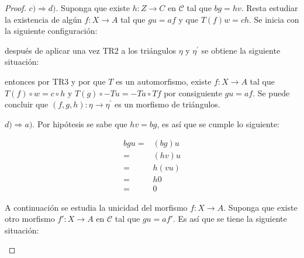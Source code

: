 \documentclass{article}
\newcommand{\cc}{\mathscr{C}}
\begin{document}
\begin{enumerate}
\begin{proof}
\bigskip

$c) \Rightarrow d)$. Suponga que existe $h:Z\to C$ en $\cc$ tal que $bg=hv$. Resta estudiar la existencia de alg\'un $f:X\to A$ tal que $gu=af$ y que $T(f)w=ch$. Se inicia con la siguiente configuración:

\begin{center}
\end{center}
después de aplicar una vez TR2 a los triángulos $\eta$ y $\eta^{'}$ se obtiene la siguiente situación:

\begin{center}
\end{center}
entonces por TR3 y por que $T$ es un automorfismo, existe $f:X\to A$ tal que $T(f)\circ w=c\circ h$ y $T(g)\circ -Tu=-Ta\circ Tf$ por consiguiente $gu=af$. Se puede concluir que $(f,g,h):\eta \to \eta^{'}$ es un morfismo de triángulos.

\bigskip

$d) \Rightarrow a)$. Por hipótesis se sabe que $hv=bg$, es así que se cumple lo siguiente:

\begin{align*}
bgu =& (bg)u\\
=& (hv)u\\
=& h(vu)\\
=& h0\\
=& 0
\end{align*}

A continuación se estudia la unicidad del morfismo $f:X\to A$. Suponga que existe otro morfismo $f':X\to A$ en $\cc$ tal que $gu=af'$. Es así que se tiene la siguiente situación:

\begin{center}
\end{center}


\end{proof}
\end{enumerate}
\end{document}
